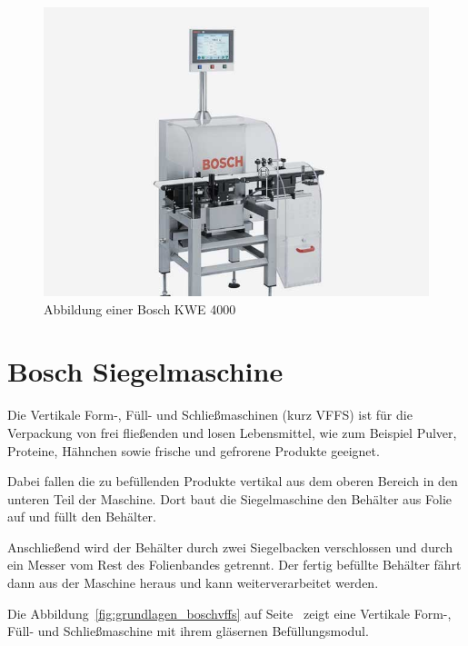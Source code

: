 \begin{figure}[h]
    \centering
    \includegraphics[scale=0.4]{images/kapitel_2/bosch_kwe.jpg}
    \caption{Abbildung einer Bosch KWE 4000}
    \label{fig:grundlagen_boschkwe}
\end{figure}

\section{Bosch Siegelmaschine}
Die Vertikale Form-, Füll- und Schließmaschinen (kurz VFFS) ist für die Verpackung von  frei fließenden und losen
Lebensmittel, wie zum Beispiel Pulver, Proteine, Hähnchen sowie frische und gefrorene Produkte geeignet.

Dabei fallen die zu befüllenden Produkte vertikal aus dem oberen Bereich in den unteren Teil der Maschine. Dort baut
die Siegelmaschine den Behälter aus Folie auf und füllt den Behälter.

Anschließend wird der Behälter durch zwei Siegelbacken verschlossen und durch ein Messer vom Rest des Folienbandes
getrennt. Der fertig befüllte Behälter fährt dann aus der Maschine heraus und kann weiterverarbeitet werden.

Die Abbildung~\ref{fig:grundlagen_boschvffs} auf Seite~\pageref{fig:grundlagen_boschvffs} zeigt eine Vertikale Form-,
Füll- und Schließmaschine mit ihrem gläsernen Befüllungsmodul.

